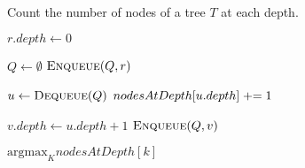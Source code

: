 
\begin{algorithm}[H]
  \caption{Count the number of nodes of a tree $T$ at each depth.}
  \label{alg:nodes-at-depth}
  \begin{algorithmic}[1]
     
      \State $r.depth \gets 0$

      \hStatex
      \State $Q \gets \emptyset$
      \State $\Call{Enqueue}{Q, r}$

      \hStatex
	\State $u \gets \Call{Dequeue}{Q}$
	\State $nodesAtDepth[u.depth] \text{\;+=\;} 1$

	\hStatex
	  \State $v.depth \gets u.depth + 1$
	  \State $\Call{Enqueue}{Q, v}$
	\EndFor
      \EndWhile

      \hStatex
      \State \Return $\text{argmax}_{K} nodesAtDepth[k]$
    \EndProcedure
  \end{algorithmic}
\end{algorithm}
